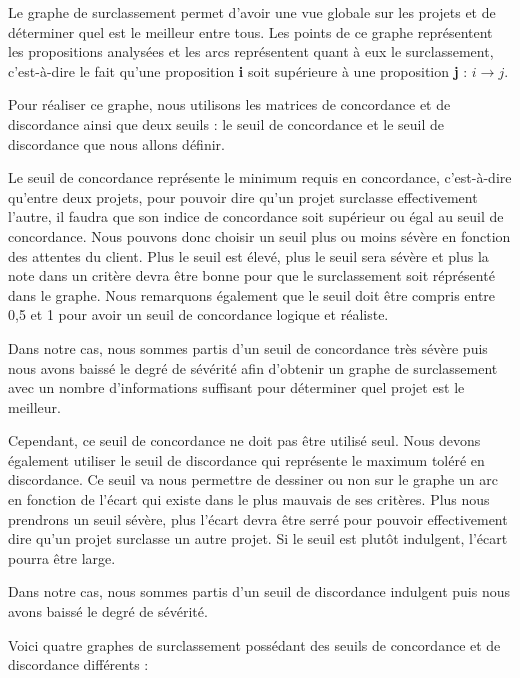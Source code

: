 \documentclass[a4paper,10pt]{article}
\begin{document}
Le graphe de surclassement permet d'avoir une vue globale sur les projets et de déterminer quel est le meilleur entre tous. Les points de ce graphe représentent les propositions analysées et les arcs représentent quant à eux le surclassement, c'est-à-dire le fait qu'une proposition \textbf{i} soit supérieure à une proposition \textbf{j} : $ i \longrightarrow j $.

Pour réaliser ce graphe, nous utilisons les matrices de concordance et de discordance ainsi que deux seuils : le seuil de concordance et le seuil de discordance que nous allons définir.

Le seuil de concordance représente le minimum requis en concordance, c'est-à-dire qu'entre deux projets, pour pouvoir dire qu'un projet surclasse effectivement l'autre, il faudra que son indice de concordance soit supérieur ou égal au seuil de concordance. Nous pouvons donc choisir un seuil plus ou moins sévère en fonction des attentes du client. Plus le seuil est élevé, plus le seuil sera sévère et plus la note dans un critère devra être bonne pour que le surclassement soit réprésenté dans le graphe. Nous remarquons également que le seuil doit être compris entre 0,5 et 1 pour avoir un seuil de concordance logique et réaliste. 

Dans notre cas, nous sommes partis d'un seuil de concordance très sévère puis nous avons baissé le degré de sévérité afin d'obtenir un graphe de surclassement avec un nombre d'informations suffisant pour déterminer quel projet est le meilleur.

Cependant, ce seuil de concordance ne doit pas être utilisé seul. Nous devons également utiliser le seuil de discordance qui représente le maximum toléré en discordance. Ce seuil va nous permettre de dessiner ou non sur le graphe un arc en fonction de l'écart qui existe dans le plus mauvais de ses critères. Plus nous prendrons un seuil sévère, plus l'écart devra être serré pour pouvoir effectivement dire qu'un projet surclasse un autre projet. Si le seuil est plutôt indulgent, l'écart pourra être large.

Dans notre cas, nous sommes partis d'un seuil de discordance indulgent puis nous avons baissé le degré de sévérité. 

Voici quatre graphes de surclassement possédant des seuils de concordance et de discordance différents :
\end{document}
